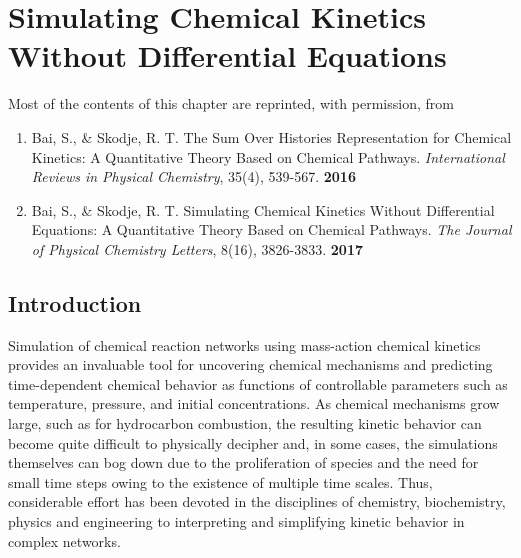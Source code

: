 \chapter{Simulating Chemical Kinetics Without Differential Equations}
\label{chapter4}
Most of the contents of this chapter are reprinted, with permission, from \
\begin{enumerate}
\item[\cite{ch4_10_bai2016sum}] Bai, S., \& Skodje, R. T. The Sum Over Histories Representation for Chemical Kinetics: A Quantitative Theory Based on Chemical Pathways. \textit{International Reviews in Physical Chemistry}, 35(4), 539-567. \textbf{2016}
\item[\cite{ch1_IRPC_18_bai2017simulating}] Bai, S., \& Skodje, R. T. Simulating Chemical Kinetics Without Differential Equations: A Quantitative Theory Based on Chemical Pathways. \textit{The Journal of Physical Chemistry Letters}, 8(16), 3826-3833. \textbf{2017}
\end{enumerate}
\section{Introduction}
\label{ch4:sec:intro}
Simulation of chemical reaction networks using mass-action chemical kinetics provides an invaluable tool for uncovering chemical mechanisms and predicting time-dependent chemical behavior as functions of controllable parameters such as temperature, pressure, and initial concentrations.  As chemical mechanisms grow large, such as for hydrocarbon combustion, the resulting kinetic behavior can become quite difficult to physically decipher and, in some cases, the simulations themselves can bog down due to the proliferation of species and the need for small time steps owing to the existence of multiple time scales.  Thus, considerable effort has been devoted in the disciplines of chemistry, biochemistry, physics and engineering to interpreting and simplifying kinetic behavior in complex networks.
\newline
